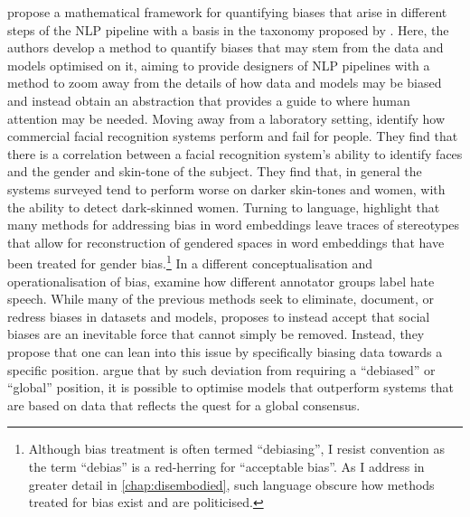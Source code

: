 \citet{Shah:2020} propose a mathematical framework for quantifying biases that arise in different steps of the NLP pipeline with a basis in the taxonomy proposed by \citet{Hovy-Spruit:2016}. 
Here, the authors develop a method to quantify biases that may stem from the data and models optimised on it, aiming to provide designers of NLP pipelines with a method to zoom away from the details of how data and models may be biased and instead obtain an abstraction that provides a guide to where human attention may be needed.
Moving away from a laboratory setting, \citet{Buolamwini:2018} identify how commercial facial recognition systems perform and fail for people. 
They find that there is a correlation between a facial recognition system's ability to identify faces and the gender and skin-tone of the subject. 
They find that, in general the systems surveyed tend to perform worse on darker skin-tones and women, with the ability to detect dark-skinned women.
Turning to language, \citet{Gonen:2019} highlight that many methods for addressing bias in word embeddings leave traces of stereotypes that allow for reconstruction of gendered spaces in word embeddings that have been treated for gender bias.\footnote{Although bias treatment is often termed ``debiasing'', I resist convention as the term ``debias'' is a red-herring for ``acceptable bias''. As I address in greater detail in \cref{chap:disembodied}, such language obscure how methods treated for bias exist and are politicised.}
In a different conceptualisation and operationalisation of bias, \citet{Waseem:2016} examine how different annotator groups label hate speech. 
While many of the previous methods seek to eliminate, document, or redress biases in datasets and models, \citet{Waseem:2016} proposes to instead accept that social biases are an inevitable force that cannot simply be removed. 
Instead, they propose that one can lean into this issue by specifically biasing data towards a specific position. 
\citet{Waseem:2016} argue that by such deviation from requiring a ``debiased'' or ``global'' position, it is possible to optimise models that outperform systems that are based on data that reflects the quest for a global consensus.

